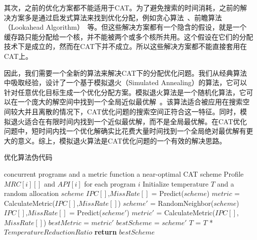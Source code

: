 其次，之前的优化方案都不能适用于CAT。为了避免搜索的时间消耗，之前的解决方案多是通过启发式算法来找到优化分配，例如贪心算法~\parencite{suh2004dynamic}、前瞻算法（Lookahead Algorithm）~\parencite{qureshi2006utility}等。但这些解决方案都有一个隐含的假设，就是一个缓存路只能分配给一个核，并不能被两个或多个核所共用。这个假设在它们的分配技术下是成立的，然而在CAT下并不成立。所以这些解决方案都不能直接套用在CAT上。

因此，我们需要一个全新的算法来解决CAT下的分配优化问题。我们从经典算法中吸取经验，设计了一个基于模拟退火（Simulated Annealing）的算法，它可以针对任意优化目标生成一个优化分配方案。模拟退火算法是一个随机化算法，它可以在一个庞大的解空间中找到一个全局近似最优解~\parencite{aarts1988simulated,hwang1988simulated}。该算法适合被应用在搜索空间较大并且离散的情况下，CAT优化问题的搜索空间正符合这一特征。同时，模拟退火适合在有限时间内找到一个近似最优解，而不是全局最优解。在CAT优化问题中，短时间内找一个优化解确实比花费大量时间找到一个全局绝对最优解有更大的意义。综上，模拟退火算法是CAT优化问题的一个有效的解决思路。

\begin{algorithm}
\caption{优化算法伪代码}
\label{alg:opt}
\begin{algorithmic}[1]
\renewcommand{\algorithmicforall}{\textbf{foreach}}
\renewcommand{\algorithmicrequire}{\textbf{Input:}}
\renewcommand{\algorithmicensure}{\textbf{Output:}}
\REQUIRE concurrent programs and a metric function
\ENSURE a near-optimal CAT scheme
\STATE Profile $MRC[i][]$ and $API[i]$ for each program $i$
\STATE Initialize temperature $T$ and a random allocation $scheme$
\STATE $IPC[]$,$MissRate[]$ = Predict($scheme$)
\STATE $metric$ = CalculateMetric($IPC[]$,$MissRate[]$)
	\STATE $scheme'$ = RandomNeighbor($scheme$)
    \STATE $IPC[]$,$MissRate[]$ = Predict($scheme'$)
    \STATE $metric'$ = CalculateMetric($IPC[]$,$MissRate[]$)
    	\STATE $bestMetric$ = $metric'$ 
        \STATE $bestScheme$ = $scheme'$
    \ENDIF
    \ELSE
    \ENDIF
    \ENDIF
    \STATE $T$ = $T$ * $TemperatureReductionRatio$
\ENDWHILE
\STATE \textbf{return} $bestScheme$

\end{algorithmic}
\end{algorithm}

